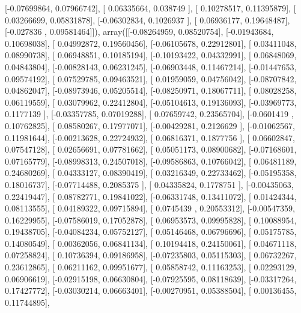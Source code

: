 \documentclass{article}
\begin{document}
       [-0.07699864,  0.07966742],
       [ 0.06335664,  0.038749  ],
       [ 0.10278517,  0.11395879],
       [ 0.03266699,  0.05831878],
       [-0.06302834,  0.1026937 ],
       [ 0.06936177,  0.19648487],
       [-0.027836  ,  0.09581464]]), array([[-0.08264959,  0.08520754],
       [-0.01943684,  0.10698038],
       [ 0.04992872,  0.19560456],
       [-0.06105678,  0.22912801],
       [ 0.03411048,  0.08990738],
       [ 0.06948851,  0.10185194],
       [-0.10193422,  0.04332991],
       [ 0.06848069,  0.04843804],
       [-0.00828143,  0.06231245],
       [-0.06903448,  0.11467214],
       [-0.01447653,  0.09574192],
       [ 0.07529785,  0.09463521],
       [ 0.01959059,  0.04756042],
       [-0.08707842,  0.04862047],
       [-0.08973946,  0.05205514],
       [-0.08250971,  0.18067711],
       [ 0.08028258,  0.06119559],
       [ 0.03079962,  0.22412804],
       [-0.05104613,  0.19136093],
       [-0.03969773,  0.1177139 ],
       [-0.03357785,  0.07019288],
       [ 0.07659742,  0.23565704],
       [-0.0601419 ,  0.10762825],
       [ 0.08580267,  0.17977071],
       [-0.00429281,  0.2126629 ],
       [-0.01062567,  0.11981644],
       [-0.00213628,  0.22724932],
       [ 0.06816371,  0.1877756 ],
       [ 0.06602847,  0.07547128],
       [ 0.02656691,  0.07781662],
       [ 0.05051173,  0.08900682],
       [-0.07168601,  0.07165779],
       [-0.08998313,  0.24507018],
       [-0.09586863,  0.10766042],
       [ 0.06481189,  0.24680269],
       [ 0.04333127,  0.08390419],
       [ 0.03216349,  0.22733462],
       [-0.05195358,  0.18016737],
       [-0.07714488,  0.2085375 ],
       [ 0.04335824,  0.1778751 ],
       [-0.00435063,  0.22419447],
       [ 0.08782771,  0.19841022],
       [-0.06331748,  0.13411072],
       [ 0.01424344,  0.08113555],
       [ 0.04189322,  0.09715894],
       [ 0.0745439 ,  0.20553312],
       [-0.00547359,  0.16229955],
       [-0.07586019,  0.17052878],
       [ 0.06953573,  0.09995828],
       [ 0.10088954,  0.19438705],
       [-0.04084234,  0.05752127],
       [ 0.05146468,  0.06796696],
       [ 0.05175785,  0.14080549],
       [ 0.00362056,  0.06841134],
       [ 0.10194418,  0.24150061],
       [ 0.04671118,  0.07258824],
       [ 0.10736394,  0.09186958],
       [-0.07235803,  0.05115303],
       [ 0.06732267,  0.23612865],
       [ 0.06211162,  0.09951677],
       [ 0.05858742,  0.11163253],
       [ 0.02293129,  0.06906619],
       [-0.02915198,  0.06630804],
       [-0.07925595,  0.08118639],
       [-0.03317264,  0.17427772],
       [-0.03030214,  0.06663401],
       [-0.00270951,  0.05388504],
       [ 0.00136455,  0.11744895],
\end{document}
